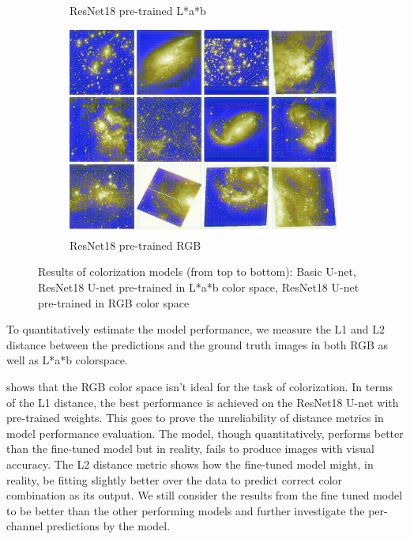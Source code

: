 \documentclass[10pt,twocolumn,letterpaper]{article}
\begin{document}
\begin{figure}[!htb]
\begin{subfigure}[t]{0.3\textwidth}
    		\caption{ResNet18 pre-trained L*a*b}
    		\label{fig: resnet18_pre}
    	\end{subfigure}
    	\begin{subfigure}[t]{0.3\textwidth}
    		\centering
    		\includegraphics[width=\textwidth]{figures/samples_coco}
    		\caption{ResNet18 pre-trained RGB}
    		\label{fig: resnet18_rgb}
    	\end{subfigure}
    	\caption{Results of colorization models (from top to bottom): Basic U-net, ResNet18 U-net pre-trained in L*a*b color space, ResNet18 U-net pre-trained in RGB color space}
    	\label{fig: comparisons}
    \end{figure}
    To quantitatively estimate the model performance, we measure the L1 and L2 distance between the predictions and the ground truth images in both RGB as well as L*a*b colorspace. 
    
     shows that the RGB color space isn't ideal for the task of colorization. In terms of the L1 distance, the best performance is achieved on the ResNet18 U-net with pre-trained weights. This goes to prove the unreliability of distance metrics in model performance evaluation. The model, though quantitatively, performs better than the fine-tuned model but in reality, fails to produce images with visual accuracy. The L2 distance metric shows how the fine-tuned model might, in reality, be fitting slightly better over the data to predict correct color combination as its output. We still consider the results from the fine tuned model to be better than the other performing models and further investigate the per-channel predictions by the model.
\end{document}
